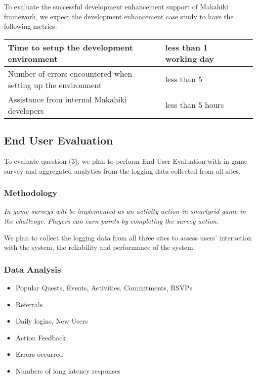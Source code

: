 \documentclass[11pt]{article}
\begin{document}
To evaluate the successful development enhancement support of Makahiki framework, we expect the development enhancement case study to have the following metrics:
\begin{center}
    \begin{tabular}{ | l | l | l | l |}
    \hline
    Time to setup the development environment & less than 1 working day \\ \hline
    Number of errors encountered when setting up the environment & less than 5 \\ \hline
    Assistance from internal Makahiki developers & less than 5 hours \\ \hline
    \end{tabular}
\end{center}

\subsection{End User Evaluation}
To evaluate question (3), we plan to perform End User Evaluation with in-game survey and aggregated analytics from the logging data collected from all sites.

\subsubsection{Methodology}

\em In-game surveys \em will be implemented as an activity action in smartgrid game in the challenge. Players can earn points by completing the survey action. 

We plan to collect the logging data from all three sites to assess users' interaction with the system, the reliability and performance of the system.

\subsubsection{Data Analysis}
\begin{itemize}
 \item Popular Quests, Events, Activities, Commitments, RSVPs
 \item Referrals
 \item Daily logins, New Users
 \item Action Feedback
 \item Errors occurred
 \item Numbers of long latency responses
\end{itemize}
\end{document}
